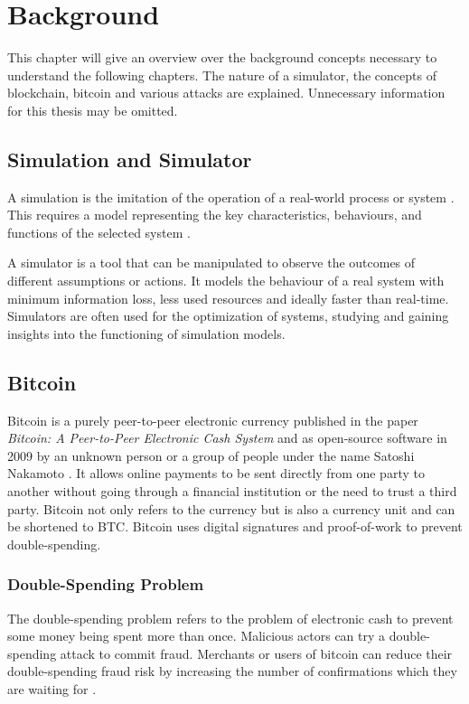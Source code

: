 \chapter{Background} 
\label{chapter:background}
This chapter will give an overview over the background concepts necessary to understand the following chapters. The nature of a simulator, the concepts of blockchain, bitcoin and various attacks are explained. Unnecessary information for this thesis may be omitted.

\section{Simulation and Simulator}
A simulation is the imitation of the operation of a real-world process or system \cite{bcnn2000}. This requires a model representing the key characteristics, behaviours, and functions of the selected system \cite{simulation}. 

A simulator is a tool that can be manipulated to observe the outcomes of different assumptions or actions. It models the behaviour of a real system with minimum information loss, less used resources and ideally faster than real-time. Simulators are often used for the optimization of systems, studying and gaining insights into the functioning of simulation models.

\section{Bitcoin}
Bitcoin is a purely peer-to-peer electronic currency published in the paper \textit{Bitcoin: A Peer-to-Peer Electronic Cash System} and as open-source software in 2009 by an unknown person or a group of people under the name Satoshi Nakamoto \cite{nakamoto2012bitcoin}. It allows online payments to be sent directly from one party to another without going through a financial institution or the need to trust a third party. Bitcoin not only refers to the currency but is also a currency unit and can be shortened to BTC. Bitcoin uses digital signatures and proof-of-work to prevent double-spending.

\subsection{Double-Spending Problem}
The double-spending problem refers to the problem of electronic cash to prevent some money being spent more than once. Malicious actors can try a double-spending attack to commit fraud. Merchants or users of bitcoin can reduce their double-spending fraud risk by increasing the number of confirmations which they are waiting for \cite{irreversibletransactions}.

